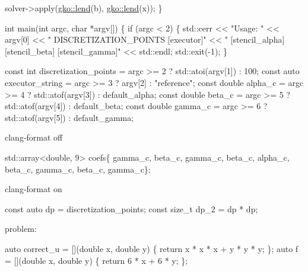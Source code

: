 {\ttfamily 
\begin{DoxyCode}
    solver->apply(\hyperlink{namespacegko_aa8cb4876b72e5e1036ea9575443c439b}{gko::lend}(b), \hyperlink{namespacegko_aa8cb4876b72e5e1036ea9575443c439b}{gko::lend}(x));
\}


\textcolor{keywordtype}{int} main(\textcolor{keywordtype}{int} argc, \textcolor{keywordtype}{char} *argv[])
\{
    \textcolor{keywordflow}{if} (argc < 2) \{
        std::cerr << \textcolor{stringliteral}{"Usage: "} << argv[0] << \textcolor{stringliteral}{" DISCRETIZATION\_POINTS [executor]"}
                  << \textcolor{stringliteral}{" [stencil\_alpha] [stencil\_beta] [stencil\_gamma]"}
                  << std::endl;
        std::exit(-1);
    \}

    \textcolor{keyword}{const} \textcolor{keywordtype}{int} discretization\_points = argc >= 2 ? std::atoi(argv[1]) : 100;
    \textcolor{keyword}{const} \textcolor{keyword}{auto} executor\_string = argc >= 3 ? argv[2] : \textcolor{stringliteral}{"reference"};
    \textcolor{keyword}{const} \textcolor{keywordtype}{double} alpha\_c = argc >= 4 ? std::atof(argv[3]) : default\_alpha;
    \textcolor{keyword}{const} \textcolor{keywordtype}{double} beta\_c = argc >= 5 ? std::atof(argv[4]) : default\_beta;
    \textcolor{keyword}{const} \textcolor{keywordtype}{double} gamma\_c = argc >= 6 ? std::atof(argv[5]) : default\_gamma;
\end{DoxyCode}
}

{\ttfamily  clang-\/format off}

{\ttfamily 
\begin{DoxyCode}
std::array<double, 9> coefs\{
    gamma\_c, beta\_c, gamma\_c,
    beta\_c, alpha\_c, beta\_c,
    gamma\_c, beta\_c, gamma\_c\};
\end{DoxyCode}
}

{\ttfamily  clang-\/format on}

{\ttfamily 
\begin{DoxyCode}
\textcolor{keyword}{const} \textcolor{keyword}{auto} dp = discretization\_points;
\textcolor{keyword}{const} \textcolor{keywordtype}{size\_t} dp\_2 = dp * dp;
\end{DoxyCode}
}

{\ttfamily  problem\+:}

{\ttfamily 
\begin{DoxyCode}
\textcolor{keyword}{auto} correct\_u = [](\textcolor{keywordtype}{double} x, \textcolor{keywordtype}{double} y) \{ \textcolor{keywordflow}{return} x * x * x + y * y * y; \};
\textcolor{keyword}{auto} f = [](\textcolor{keywordtype}{double} x, \textcolor{keywordtype}{double} y) \{ \textcolor{keywordflow}{return} 6 * x + 6 * y; \};
\end{DoxyCode}
}

